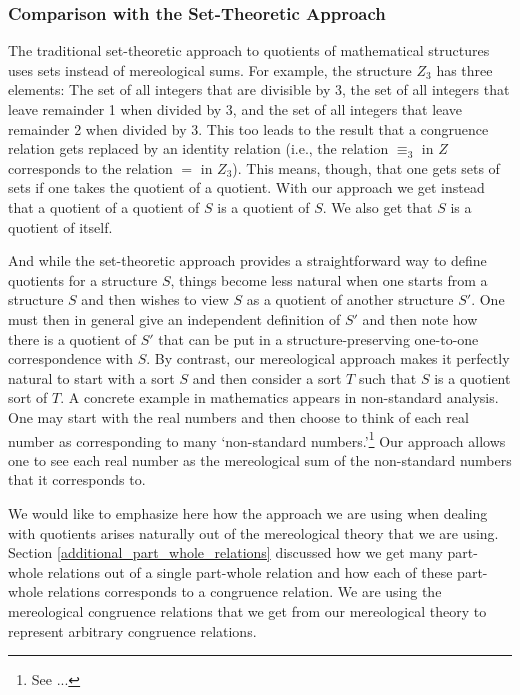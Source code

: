 \documentclass[12pt]{book}
\begin{document}
\subsubsection{Comparison with the Set-Theoretic Approach}
The traditional set-theoretic approach to quotients of mathematical structures uses sets instead of mereological sums. For example, the structure $Z_3$ has three elements: The set of all integers that are divisible by 3, the set of all integers that leave remainder 1 when divided by 3, and the set of all integers that leave remainder 2 when divided by 3. This too leads to the result that a congruence relation gets replaced by an identity relation (i.e., the relation $\equiv_3$ in $Z$ corresponds to the relation $=$ in $Z_3$). This means, though, that one gets sets of sets if one takes the quotient of a quotient. With our approach we get instead that a quotient of a quotient of $S$ is a quotient of $S$. We also get that $S$ is a quotient of itself.

And while the set-theoretic approach provides a straightforward way to define quotients for a structure $S$, things become less natural when one starts from a structure $S$ and then wishes to view $S$ as a quotient of another structure $S'$. One must then in general give an independent definition of $S'$ and then note how there is a quotient of $S'$ that can be put in a structure-preserving one-to-one correspondence with $S$. By contrast, our mereological approach makes it  perfectly natural to start with a sort $S$ and then consider a sort $T$ such that $S$ is a quotient sort of $T$. A concrete example in mathematics appears in non-standard analysis. One may start with the real numbers and then choose to think of each real number as corresponding to many `non-standard numbers.'\footnote{See ...} Our approach allows one to see each real number as the mereological sum of the non-standard numbers that it corresponds to.

We would like to emphasize here how the approach we are using when dealing with quotients arises naturally out of the mereological theory that we are using. Section \ref{additional_part_whole_relations} discussed how we get many part-whole relations out of a single part-whole relation and how each of these part-whole relations corresponds to a congruence relation. We are using the mereological congruence relations that we get from our mereological theory to represent arbitrary congruence relations.
\end{document}
